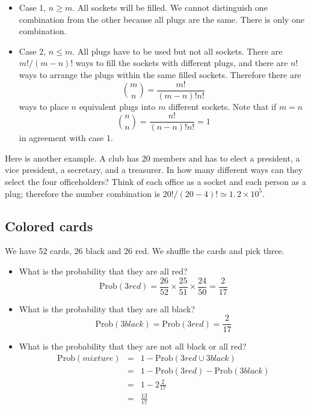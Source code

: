 \documentclass[justified, sixbynine]{tufte-book}
\theoremstyle{plain}%
\newtheorem * {corollary}{Corollary}
\theoremstyle{definition}
\theoremstyle{remark}
\newtheorem * {remark}{Remark}
\newtheorem * {note}{Note}
\begin{document}
\begin{fullwidth}
\begin{itemize}
\item  Case 1, $n\geq m$. All sockets will be filled. We cannot distinguish
one combination from the other because all plugs are the same. There is only
one combination.

\item  Case 2, $n\leq m$. All plugs have to be used but not all sockets.
There are $m!/(m-n)!$ ways to fill the sockets with different plugs, and
there are $n!$ ways to arrange the plugs within the same filled sockets.
Therefore there are
\begin{equation}
\binom mn=\frac{m!}{(m-n)!n!}
\end{equation}
ways to place $n$ equivalent plugs into $m$ different sockets. Note that if $%
m=n$%
\begin{equation}
\binom nn=\frac{n!}{(n-n)!n!}=1
\end{equation}
in agreement with case 1.
\end{itemize}

Here is another example. A club has 20 members and has to elect a president, a vice president, 
a secretary, and a treasurer. In how many different ways can they select the
four officeholders? Think of each office as a socket and each person as a
plug; therefore the number combination is $20!/(20-4)!\simeq \allowbreak
1.\, 2\times 10^5$.

\goodbreak\subsection{Colored cards}

We have 52 cards, 26 black and 26 red. We shuffle the cards and pick three.

\begin{itemize}
\item  What is the probability that they are all red?
\begin{equation}
\textrm{Prob}(3red)=\frac{26}{52}\times \frac{25}{51}\times \frac{24}{50}=\frac{2}{17}
\end{equation}

\item  What is the probability that they are all black?
\begin{equation}
\textrm{Prob}(3black)=\textrm{Prob}(3red)=\frac{2}{17}
\end{equation}

\item  What is the probability that they are not all black or all red?
\begin{eqnarray}
\textrm{Prob}(mixture) &=&1-\textrm{Prob}(3red\cup 3black) \\
&=&1-\textrm{Prob}(3red)-\textrm{Prob}(3black) \\
&=&1-2\frac{2}{17} \\
&=&\frac{13}{17}
\end{eqnarray}
\end{itemize}


\end{fullwidth}
\end{document}
